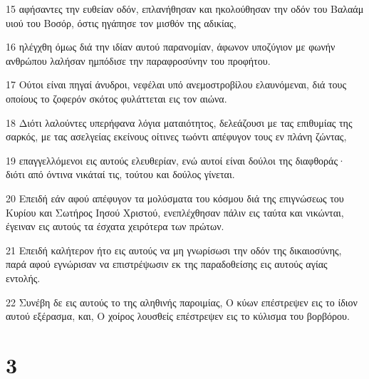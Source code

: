 \par 15 αφήσαντες την ευθείαν οδόν, επλανήθησαν και ηκολούθησαν την οδόν του Βαλαάμ υιού του Βοσόρ, όστις ηγάπησε τον μισθόν της αδικίας,
\par 16 ηλέγχθη όμως διά την ιδίαν αυτού παρανομίαν, άφωνον υποζύγιον με φωνήν ανθρώπου λαλήσαν ημπόδισε την παραφροσύνην του προφήτου.
\par 17 Ούτοι είναι πηγαί άνυδροι, νεφέλαι υπό ανεμοστροβίλου ελαυνόμεναι, διά τους οποίους το ζοφερόν σκότος φυλάττεται εις τον αιώνα.
\par 18 Διότι λαλούντες υπερήφανα λόγια ματαιότητος, δελεάζουσι με τας επιθυμίας της σαρκός, με τας ασελγείας εκείνους οίτινες τωόντι απέφυγον τους εν πλάνη ζώντας,
\par 19 επαγγελλόμενοι εις αυτούς ελευθερίαν, ενώ αυτοί είναι δούλοι της διαφθοράς· διότι από όντινα νικάταί τις, τούτου και δούλος γίνεται.
\par 20 Επειδή εάν αφού απέφυγον τα μολύσματα του κόσμου διά της επιγνώσεως του Κυρίου και Σωτήρος Ιησού Χριστού, ενεπλέχθησαν πάλιν εις ταύτα και νικώνται, έγειναν εις αυτούς τα έσχατα χειρότερα των πρώτων.
\par 21 Επειδή καλήτερον ήτο εις αυτούς να μη γνωρίσωσι την οδόν της δικαιοσύνης, παρά αφού εγνώρισαν να επιστρέψωσιν εκ της παραδοθείσης εις αυτούς αγίας εντολής.
\par 22 Συνέβη δε εις αυτούς το της αληθινής παροιμίας, Ο κύων επέστρεψεν εις το ίδιον αυτού εξέρασμα, και, Ο χοίρος λουσθείς επέστρεψεν εις το κύλισμα του βορβόρου.

\chapter{3}

